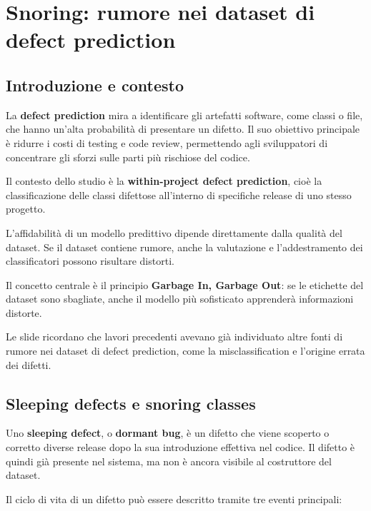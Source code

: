 \chapter{Snoring: rumore nei dataset di defect prediction}

\section{Introduzione e contesto}

La \textbf{defect prediction} mira a identificare gli artefatti software, come classi o file, che hanno un'alta probabilità di presentare un difetto. Il suo obiettivo principale è ridurre i costi di testing e code review, permettendo agli sviluppatori di concentrare gli sforzi sulle parti più rischiose del codice.

Il contesto dello studio è la \textbf{within-project defect prediction}, cioè la classificazione delle classi difettose all'interno di specifiche release di uno stesso progetto.

L'affidabilità di un modello predittivo dipende direttamente dalla qualità del dataset. Se il dataset contiene rumore, anche la valutazione e l'addestramento dei classificatori possono risultare distorti.

\begin{notaprof}
Il concetto centrale è il principio \textbf{Garbage In, Garbage Out}: se le etichette del dataset sono sbagliate, anche il modello più sofisticato apprenderà informazioni distorte.
\end{notaprof}

\begin{notaslide}
Le slide ricordano che lavori precedenti avevano già individuato altre fonti di rumore nei dataset di defect prediction, come la misclassification e l'origine errata dei difetti.
\end{notaslide}

\section{Sleeping defects e snoring classes}

Uno \textbf{sleeping defect}, o \textbf{dormant bug}, è un difetto che viene scoperto o corretto diverse release dopo la sua introduzione effettiva nel codice. Il difetto è quindi già presente nel sistema, ma non è ancora visibile al costruttore del dataset.

Il ciclo di vita di un difetto può essere descritto tramite tre eventi principali:

